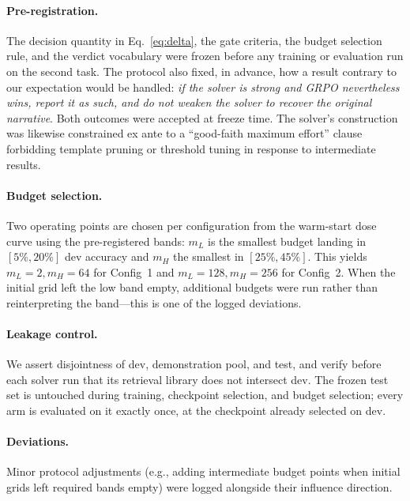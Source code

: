 \paragraph{Pre-registration.}
The decision quantity in Eq.~\eqref{eq:delta}, the gate criteria, the budget
selection rule, and the verdict vocabulary were frozen before any training or
evaluation run on the second task. The protocol also fixed, in advance, how a
result contrary to our expectation would be handled: \emph{if the solver is
strong and GRPO nevertheless wins, report it as such, and do not weaken the
solver to recover the original narrative}. Both outcomes were accepted at
freeze time. The solver's construction was likewise constrained ex ante to a
``good-faith maximum effort'' clause forbidding template pruning or threshold
tuning in response to intermediate results.

\paragraph{Budget selection.}
Two operating points are chosen per configuration from the warm-start dose
curve using the pre-registered bands: $m_L$ is the smallest budget landing in
$[5\%, 20\%]$ dev accuracy and $m_H$ the smallest in $[25\%, 45\%]$. This
yields $m_L{=}2, m_H{=}64$ for Config~1 and $m_L{=}128, m_H{=}256$ for
Config~2. When the initial grid left the low band empty, additional budgets
were run rather than reinterpreting the band---this is one of the logged
deviations.

\paragraph{Leakage control.}
We assert disjointness of dev, demonstration pool, and test, and verify before
each solver run that its retrieval library does not intersect dev. The frozen
test set is untouched during training, checkpoint selection, and budget
selection; every arm is evaluated on it exactly once, at the checkpoint already
selected on dev.

\paragraph{Deviations.}
Minor protocol adjustments (e.g., adding intermediate budget points when initial grids left required bands empty) were logged alongside their influence direction.
